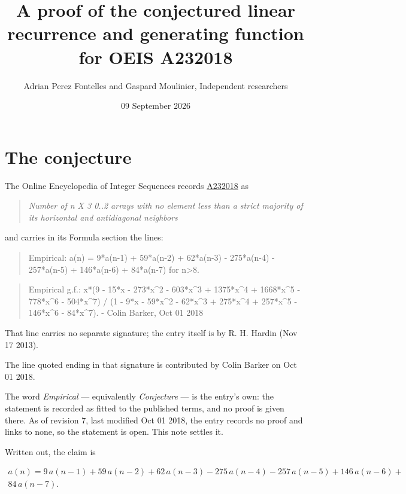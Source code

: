 \documentclass[11pt]{article}
\title{A proof of the conjectured linear recurrence and generating function for OEIS A232018}
\author{Adrian Perez Fontelles and Gaspard Moulinier, Independent researchers}
\date{09 September 2026}
\theoremstyle{definition}
\begin{document}
\maketitle
\section{The conjecture}

The Online Encyclopedia of Integer Sequences records \href{https://oeis.org/A232018}{A232018} as

\begin{quote}\itshape Number of n X 3 0..2 arrays with no element less than a strict majority of its horizontal and antidiagonal neighbors\end{quote}

and carries in its Formula section the lines:

\begin{quote}\ttfamily Empirical: a(n) = 9*a(n-1) + 59*a(n-2) + 62*a(n-3) - 275*a(n-4) - 257*a(n-5) + 146*a(n-6) + 84*a(n-7) for n>8.\end{quote}

\begin{quote}\ttfamily Empirical g.f.: x*(9 - 15*x - 273*x\textasciicircum{}2 - 603*x\textasciicircum{}3 + 1375*x\textasciicircum{}4 + 1668*x\textasciicircum{}5 - 778*x\textasciicircum{}6 - 504*x\textasciicircum{}7) / (1 - 9*x - 59*x\textasciicircum{}2 - 62*x\textasciicircum{}3 + 275*x\textasciicircum{}4 + 257*x\textasciicircum{}5 - 146*x\textasciicircum{}6 - 84*x\textasciicircum{}7). - Colin Barker, Oct 01 2018\end{quote}

That line carries no separate signature; the entry itself is by R. H. Hardin (Nov 17 2013).

The line quoted ending in that signature is contributed by Colin Barker on Oct 01 2018.

The word {\itshape Empirical} --- equivalently {\itshape Conjecture} --- is the entry's own: the statement is recorded as fitted to the published terms, and no proof is given there. As of revision 7, last modified Oct 01 2018, the entry records no proof and links to none, so the statement is open. This note settles it.

Written out, the claim is

\begin{multline*} a(n) = 9\,a(n-1) + 59\,a(n-2) + 62\,a(n-3) - 275\,a(n-4) - 257\,a(n-5) + 146\,a(n-6) + \\ 84\,a(n-7). \end{multline*}
\end{document}

